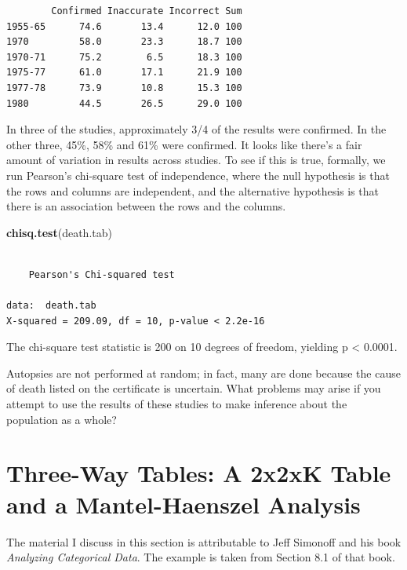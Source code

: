 \documentclass[
]{book}
\newenvironment{Shaded}{\begin{snugshade}}{\end{snugshade}}
\newcommand{\KeywordTok}[1]{\textcolor[rgb]{0.13,0.29,0.53}{\textbf{#1}}}
\newcommand{\NormalTok}[1]{#1}
\begin{document}
\begin{verbatim}
        Confirmed Inaccurate Incorrect Sum
1955-65      74.6       13.4      12.0 100
1970         58.0       23.3      18.7 100
1970-71      75.2        6.5      18.3 100
1975-77      61.0       17.1      21.9 100
1977-78      73.9       10.8      15.3 100
1980         44.5       26.5      29.0 100
\end{verbatim}

In three of the studies, approximately 3/4 of the results were confirmed. In the other three, 45\%, 58\% and 61\% were confirmed. It looks like there's a fair amount of variation in results across studies. To see if this is true, formally, we run Pearson's chi-square test of independence, where the null hypothesis is that the rows and columns are independent, and the alternative hypothesis is that there is an association between the rows and the columns.

\begin{Shaded}
\begin{Highlighting}[]
\KeywordTok{chisq.test}\NormalTok{(death.tab)}
\end{Highlighting}
\end{Shaded}

\begin{verbatim}

	Pearson's Chi-squared test

data:  death.tab
X-squared = 209.09, df = 10, p-value < 2.2e-16
\end{verbatim}

The chi-square test statistic is 200 on 10 degrees of freedom, yielding p \textless{} 0.0001.

Autopsies are not performed at random; in fact, many are done because the cause of death listed on the certificate is uncertain. What problems may arise if you attempt to use the results of these studies to make inference about the population as a whole?

\hypertarget{three-way-tables-a-2x2xk-table-and-a-mantel-haenszel-analysis}{%
\section{Three-Way Tables: A 2x2xK Table and a Mantel-Haenszel Analysis}\label{three-way-tables-a-2x2xk-table-and-a-mantel-haenszel-analysis}}

The material I discuss in this section is attributable to Jeff Simonoff and his book \emph{Analyzing Categorical Data}. The example is taken from Section 8.1 of that book.
\end{document}

